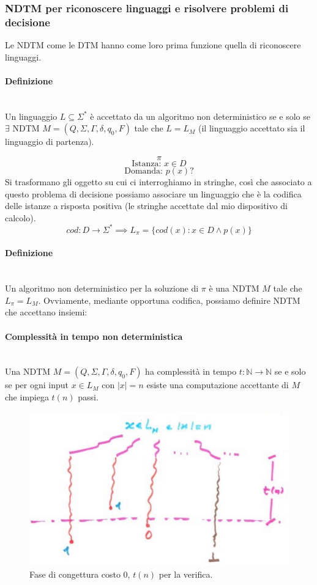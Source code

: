 \documentclass{article}
\begin{document}
\subsubsection{NDTM per riconoscere linguaggi e risolvere problemi di decisione}
Le NDTM come le DTM hanno come loro prima funzione quella di riconoscere linguaggi.
\paragraph{Definizione}\mbox{}\\
Un linguaggio $L\subseteq\Sigma^*$ è accettato da un algoritmo non deterministico
se e solo se $\exists$ NDTM $M=(Q,\Sigma,\Gamma,\delta,q_0,F)$ tale che $L=L_M$ (il
linguaggio accettato sia il linguaggio di partenza).

$$\pi$$
$$\text{Istanza: }x\in D$$
$$\text{Domanda: }p(x)?$$
Si trasformano gli oggetto su cui ci interroghiamo in stringhe, così che associato a questo
problema di decisione possiamo associare un linguaggio che è la codifica delle istanze
a risposta positiva (le stringhe accettate dal mio dispositivo di calcolo).
$$cod:D\rightarrow\Sigma^*\implies L_{\pi}=\{cod(x):x\in D\land p(x)\}$$

\paragraph{Definizione}\mbox{}\\
Un algoritmo non deterministico per la soluzione di $\pi$ è una NDTM $M$ tale che $L_\pi=L_M$.
Ovviamente, mediante opportuna codifica, possiamo definire NDTM che accettano insiemi:
\paragraph{Complessità in tempo non deterministica}\mbox{}\\
Una NDTM $M=(Q,\Sigma,\Gamma,\delta,q_0,F)$ ha complessità in tempo  $t:\mathbb{N}\rightarrow\mathbb{N}$
se e solo se per ogni input $x\in L_M$ con $|x|=n$ esiste una computazione accettante di $M$
che impiega $t(n)$ passi.
\begin{figure}[H]
    \centering
    \includegraphics[scale=0.6]{images/ndtmcomplex.png}
    \caption{Fase di congettura costo 0, $t(n)$ per la verifica.}
\end{figure}
\end{document}
